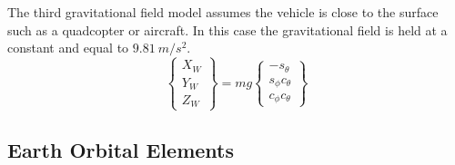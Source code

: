 \documentclass{article}
\begin{document}
The third gravitational field model assumes the vehicle is close to
the surface such as a quadcopter or aircraft. In this case the
gravitational field is held at a constant and equal to $9.81~m/s^2$.
\begin{equation}\label{e:wforce}
\begin{Bmatrix} X_W \\ Y_W \\ Z_W \end{Bmatrix} = mg \begin{Bmatrix}
-s_{\theta} \\ s_{\phi}c_{\theta} \\ c_{\phi}c_{\theta} \end{Bmatrix}
\end{equation}

\subsection{Earth Orbital Elements}\label{s:ephemeris}
\end{document}
